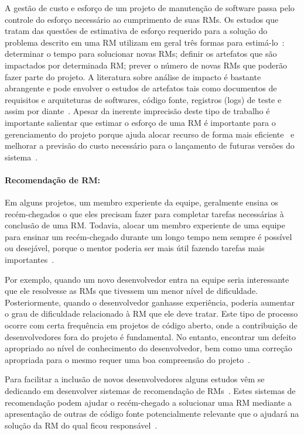 A gestão de custo e esforço de um projeto de manutenção de software passa pelo
controle do esforço necessário ao cumprimento de suas RMs. Os estudos que tratam
das questões de estimativa de esforço requerido para a solução do problema
descrito em uma RM utilizam em geral três formas para
estimá-lo~\cite{cavalcanti2014challenges}: determinar o tempo para solucionar
novas RMs; definir os artefatos que são impactados por determinada RM\@; prever
o número de novas RMs que poderão fazer parte do projeto. A literatura sobre
análise de impacto é bastante abrangente e pode envolver o estudos de artefatos
tais como documentos de requisitos e arquiteturas de softwares, código fonte,
registros (logs) de teste e assim por diante~\cite{cavalcanti2014challenges}.
Apesar da inerente imprecisão deste tipo de trabalho é importante salientar que
estimar o esforço de uma RM é importante para o gerenciamento do projeto porque
ajuda alocar recurso de forma mais
eficiente~\cite{Bhattacharya:2011:BTP:1985441.1985472} e melhorar a previsão do
custo necessário para o lançamento de futuras versões do
sistema~\cite{Vijayakumar2014}.

\paragraph{Recomendação de RM:}

Em alguns projetos, um membro experiente da equipe, geralmente ensina os
recém-chegados o que eles precisam fazer para completar tarefas necessárias à
conclusão de uma RM\@. Todavia, alocar um membro experiente de uma equipe para
ensinar um recém-chegado durante um longo tempo nem sempre é possível ou
desejável, porque o mentor poderia ser mais útil fazendo tarefas mais
importantes~\cite{malheiros2012source}.

Por exemplo, quando um novo desenvolvedor entra na equipe seria interessante que
ele resolvesse as RMs que tivessem um menor nível de dificuldade.
Posteriormente, quando o desenvolvedor ganhasse experiência, poderia aumentar o
grau de dificuldade relacionado à RM que ele deve tratar.  Este tipo de processo
ocorre com certa frequência em projetos de código aberto, onde a contribuição de
desenvolvedores fora do projeto é fundamental. No entanto, encontrar um defeito
apropriado ao nível de conhecimento do desenvolvedor, bem como uma correção
apropriada para o mesmo requer uma boa compreensão do
projeto~\cite{Wang2011bug}.

Para facilitar a inclusão de novos desenvolvedores alguns estudos vêm se
dedicando em desenvolver sistemas de recomendação de
RMs~\cite{malheiros2012source, Wang2011bug}. Estes sistemas de recomendação
podem ajudar o recém-chegado a solucionar uma RM mediante a apresentação de
outras de código fonte potencialmente relevante que o ajudará na solução da RM
do qual ficou responsável~\cite{malheiros2012source}.


